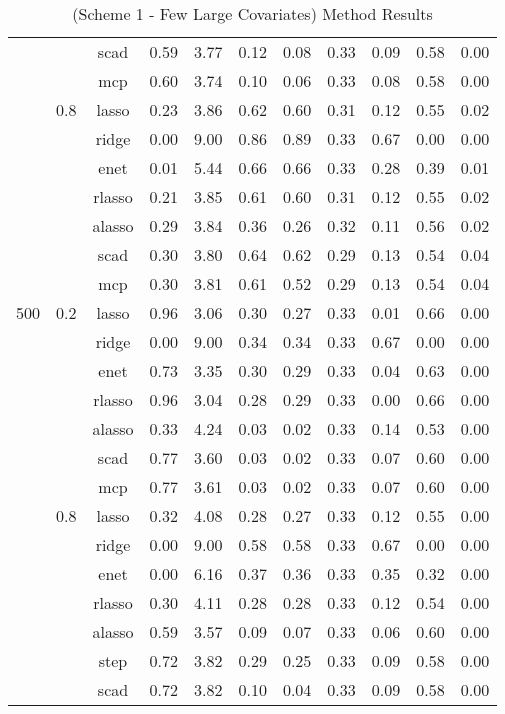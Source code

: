 \begin{table}[H]
{\begin{tabular}{c c c|c|c|c c|c c c c}
        & &scad &0.59 &3.77 &0.12 &0.08 &0.33 &0.09 &0.58 &0.00\\
        & &mcp &0.60 &3.74 &0.10&0.06 &0.33 &0.08 &0.58 &0.00\\
        \cline{2-11}
        &0.8 &lasso &0.23 &3.86 &0.62 &0.60 &0.31 &0.12 &0.55 &0.02\\
        & &ridge &0.00 &9.00 &0.86 &0.89 &0.33 &0.67 &0.00&0.00\\
        & &enet &0.01 &5.44 &0.66 &0.66 &0.33 &0.28 &0.39 &0.01\\
        & &rlasso &0.21 &3.85 &0.61 &0.60 &0.31 &0.12 &0.55 &0.02\\
        & &alasso &0.29 &3.84 &0.36 &0.26 &0.32 &0.11 &0.56 &0.02\\
        & &scad &0.30&3.80 &0.64 &0.62 &0.29 &0.13 &0.54 &0.04\\
        & &mcp &0.30&3.81 &0.61 &0.52 &0.29 &0.13 &0.54 &0.04\\
        \hline
        500 &0.2 &lasso &0.96 &3.06 &0.30&0.27 &0.33 &0.01 &0.66 &0.00\\
        & &ridge &0.00 &9.00 &0.34 &0.34 &0.33 &0.67 &0.00&0.00\\
        & &enet &0.73 &3.35 &0.30&0.29 &0.33 &0.04 &0.63 &0.00\\
        & &rlasso &0.96 &3.04 &0.28 &0.29 &0.33 &0.00&0.66 &0.00\\
        & &alasso &0.33 &4.24 &0.03 &0.02 &0.33 &0.14 &0.53 &0.00\\
        & &scad &0.77 &3.60 &0.03 &0.02 &0.33 &0.07 &0.60 &0.00\\
        & &mcp &0.77 &3.61 &0.03 &0.02 &0.33 &0.07 &0.60 &0.00\\
        \cline{2-11}
        &0.8 &lasso &0.32 &4.08 &0.28 &0.27 &0.33 &0.12 &0.55 &0.00\\
        & &ridge &0.00 &9.00 &0.58 &0.58 &0.33 &0.67 &0.00&0.00\\
        & &enet &0.00&6.16 &0.37 &0.36 &0.33 &0.35 &0.32 &0.00\\
        & &rlasso &0.30&4.11 &0.28 &0.28 &0.33 &0.12 &0.54 &0.00\\
        & &alasso &0.59 &3.57 &0.09 &0.07 &0.33 &0.06 &0.60 &0.00\\
        & &step &0.72 &3.82 &0.29 &0.25 &0.33 &0.09 &0.58 &0.00\\
        & &scad &0.72 &3.82 &0.10&0.04 &0.33 &0.09 &0.58 &0.00\\
        \hline
    \end{tabular}
    }
    \caption{(Scheme 1 - Few Large Covariates) Method Results}
    \label{tbl:scheme-1-results}
\end{table}

